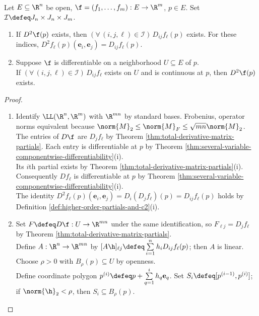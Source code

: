 \begin{theorem} \label{thm:second-derivative-partials-and-continuity}
\\
Let $E\subseteq\R^n$ be open, $\f=(f_1,\ldots,f_m):E\to\R^m$, $p\in E$. Set $\mathcal I\defeq J_n\times J_n\times J_m$.
\begin{enumerate}[label=(\roman*)]
\setlength{\itemsep}{0pt}
\item If $D^2\f(p)$ exists, then $(\forall\,(i,j,\ell)\in\mathcal I)\,D_{ij}f_\ell(p)$ exists. For these indices, $D^2 f_\ell(p)(\mathbf e_i,\mathbf e_j)=D_{ij}f_\ell(p)$.
\item Suppose $\f$ is differentiable on a neighborhood $U\subseteq E$ of $p$.\\
If $(\forall\,(i,j,\ell)\in\mathcal I)\,D_{ij}f_\ell$ exists on $U$ and is continuous at $p$, then $D^2\f(p)$ exists.
\end{enumerate}
\begin{proof}
\begin{enumerate}[label=(\roman*)]
\setlength{\itemsep}{0pt}
\item Identify $\LL(\R^n,\R^m)$ with $\R^{mn}$ by standard bases. Frobenius, operator norms equivalent because $\norm{M}_2\leq\norm{M}_F\leq\sqrt{mn}\norm{M}_2$.\\
The entries of $D\f$ are $D_jf_\ell$ by Theorem \ref{thm:total-derivative-matrix-partials}. Each entry is differentiable at $p$ by Theorem \ref{thm:several-variable-componentwise-differentiability}(i).\\
Its $i$th partial exists by Theorem \ref{thm:total-derivative-matrix-partials}(i). Consequently $Df_\ell$ is differentiable at $p$ by Theorem \ref{thm:several-variable-componentwise-differentiability}(i).\\
The identity $D^2 f_\ell(p)(\mathbf e_i,\mathbf e_j) =D_i(D_jf_\ell)(p)=D_{ij}f_\ell(p)$ holds by Definition \ref{def:higher-order-partials-and-c2}(i).
\item Set $F\defeq D\f:U\to\R^{mn}$ under the same identification, so $F_{\ell j}=D_jf_\ell$ by Theorem \ref{thm:total-derivative-matrix-partials}.\\
Define $A:\R^n\to\R^{mn}$ by $[A\h]_{\ell j}\defeq\sum\limits_{i=1}^{n}h_iD_{ij}f_\ell(p)$; then $A$ is linear. Choose $\rho>0$ with $B_\rho(p)\subseteq U$ by openness.\\
Define coordinate polygon $p^{(i)}\defeq p+\sum\limits_{q=1}^{i}h_q\mathbf e_q$. Set $S_i\defeq[p^{(i-1)},p^{(i)}]$; if $\norm{\h}_2<\rho$, then $S_i\subseteq B_\rho(p)$.\\

\end{enumerate}
\end{proof}
\end{theorem}
